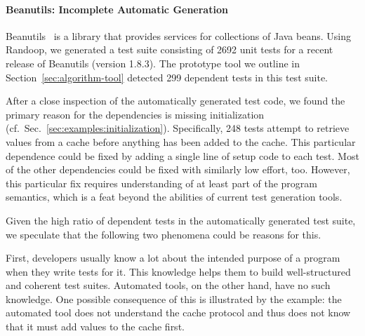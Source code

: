 \paragraph{Beanutils: Incomplete Automatic Generation}

Beanutils~\cite{beanutils}
is a library that provides services for collections of
Java beans. Using Randoop, we generated a test suite consisting of
2692 unit tests for a recent release of Beanutils (version 1.8.3).
The prototype tool we outline in
Section~\ref{sec:algorithm-tool} detected 299 dependent tests in this test
suite.

After a close inspection of the automatically generated test code, we found
the primary reason for the dependencies is missing initialization 
(cf.~Sec.~\ref{sec:examples:initialization}).
Specifically, 248 tests attempt to retrieve values from a cache before
anything has been added to the cache. This particular dependence could be
fixed by adding a single line of setup code to each test.
Most of the other dependencies could be fixed with similarly low effort, too.
However, this particular fix requires understanding of at least part
of the program semantics, which is a feat beyond the abilities of
current test generation tools.



Given the high ratio of dependent tests in the automatically generated
test suite, we speculate that the following two phenomena could be
reasons for this.

First, developers usually know a lot about the intended purpose of a
program when they write tests for it. This knowledge helps them to
build well-structured and coherent test suites.
Automated tools, on the other hand, have no such knowledge. One
possible consequence of this is illustrated by the example: the
automated tool does not understand the cache protocol and thus does
not know that it must add values to the cache first. 

